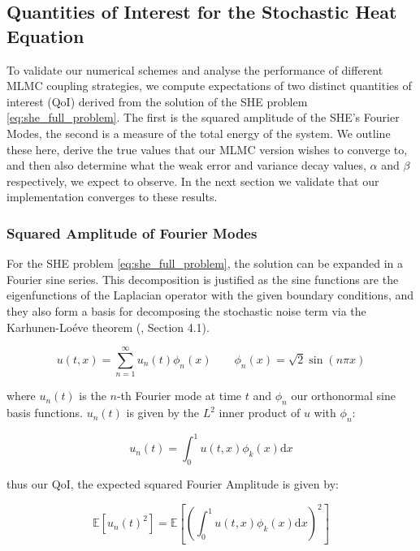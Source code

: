 \subsection{Quantities of Interest for the Stochastic Heat Equation}\label{sec:QoI_for_SHE}

To validate our numerical schemes and analyse the performance 
of different MLMC coupling strategies, we compute expectations
of two distinct quantities of interest (QoI) derived from the solution 
of the SHE problem \eqref{eq:she_full_problem}.
The first is the squared amplitude of the SHE's Fourier Modes,
the second is a measure of the total energy of the 
system. We outline these here, derive the true values that
our MLMC version wishes to converge to, and then also 
determine what the weak error and variance decay values, $\alpha$ and 
$\beta$ respectively, we expect to observe. In the next section
we validate that our implementation converges to these results. 

\subsubsection{Squared Amplitude of Fourier Modes}

For the SHE problem \eqref{eq:she_full_problem}, 
the solution can be expanded in a Fourier sine series. This 
decomposition is justified 
as the sine functions are the eigenfunctions of the Laplacian 
operator with the given boundary conditions, and they also form a basis 
for decomposing the stochastic noise term via the Karhunen-Loéve theorem
(\cite{da2014stochastic}, Section 4.1).

\begin{equation*}
    u(t,x) = \sum_{n=1}^\infty u_n(t)\phi_n(x) \qquad \phi_n(x) = \sqrt{2}\sin (n\pi x)
\end{equation*}

where $u_n(t)$ is the $n$-th Fourier mode at time $t$ and $\phi_n$ our 
orthonormal sine basis functions. $u_n(t)$ is given by the $L^2$ 
inner product of $u$ with $\phi_n$:

\begin{equation*}
    u_n(t) = \int_0^1 u(t,x)\phi_k(x)\mathrm{d}x
\end{equation*}

thus our QoI, the expected squared Fourier Amplitude is given by:

\begin{equation*}
    \mathbb{E}\left[u_n(t)^2\right] = 
    \mathbb{E}\left[\left(\int_0^1 u(t,x)\phi_k(x)\mathrm{d}x\right)^2\right]
\end{equation*}

